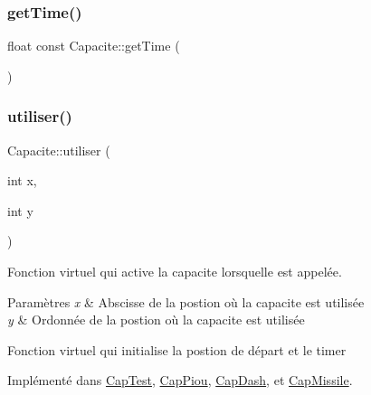 \mbox{\label{class_capacite_a963dd214cc53c76358b5326d9164884f}} 
\subsubsection{\texorpdfstring{get\+Time()}{getTime()}}
{\footnotesize\ttfamily float const Capacite\+::get\+Time (\begin{DoxyParamCaption}{ }\end{DoxyParamCaption})\hspace{0.3cm}{\ttfamily [inline]}}

\mbox{\label{class_capacite_a6f5e6efda11f80ab8538e23f5bdc6e79}} 
\subsubsection{\texorpdfstring{utiliser()}{utiliser()}}
{\footnotesize\ttfamily Capacite\+::utiliser (\begin{DoxyParamCaption}\item[{int}]{x,  }\item[{int}]{y }\end{DoxyParamCaption})\hspace{0.3cm}{\ttfamily [pure virtual]}}



Fonction virtuel qui active la capacite lorsqu\textquotesingle{}elle est appelée. 


\begin{DoxyParams}{Paramètres}
{\em x} & Abscisse de la postion où la capacite est utilisée \\
\hline
{\em y} & Ordonnée de la postion où la capacite est utilisée\\
\hline
\end{DoxyParams}
Fonction virtuel qui initialise la postion de départ et le timer 

Implémenté dans \hyperlink{class_cap_test_a9c85a17dec6cf78f1438b08b175f650d}{Cap\+Test}, \hyperlink{class_cap_piou_aad0eb3b9fab67785e1d0441b96aa921f}{Cap\+Piou}, \hyperlink{class_cap_dash_a8a0fe26c8b13d8a9f6cf5a95d6559f3d}{Cap\+Dash}, et \hyperlink{class_cap_missile_a4ba082615a3721083142549a4c8216ad}{Cap\+Missile}.



